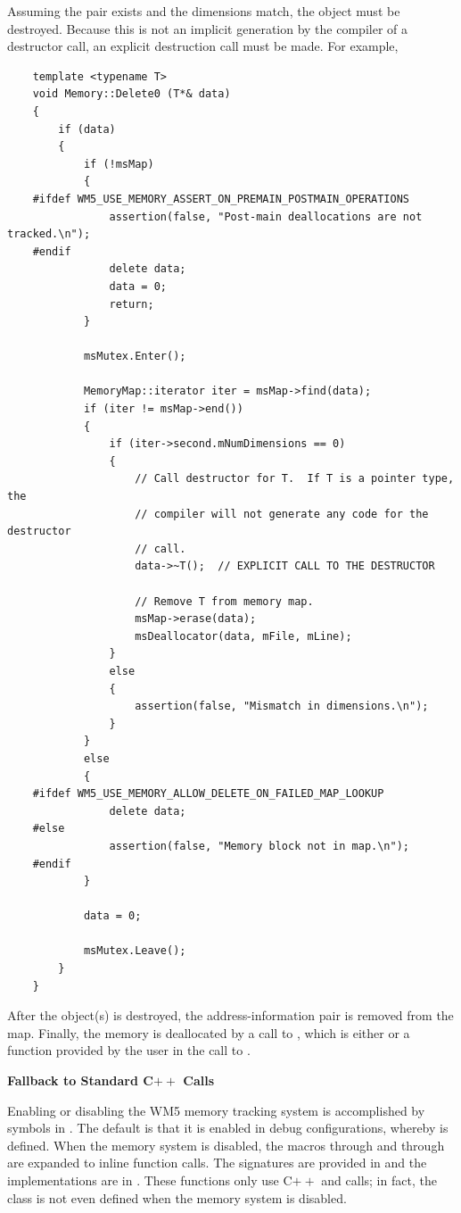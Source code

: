 \documentclass{article}
\begin{document}
Assuming the pair exists and the dimensions match, the object must be destroyed.
Because this is not an implicit generation by the compiler of a destructor call,
an explicit destruction call must be made.  For example,

\scriptsize
\begin{verbatim}
    template <typename T>
    void Memory::Delete0 (T*& data)
    {
        if (data)
        {
            if (!msMap)
            {
    #ifdef WM5_USE_MEMORY_ASSERT_ON_PREMAIN_POSTMAIN_OPERATIONS
                assertion(false, "Post-main deallocations are not tracked.\n");
    #endif
                delete data;
                data = 0;
                return;
            }

            msMutex.Enter();

            MemoryMap::iterator iter = msMap->find(data);
            if (iter != msMap->end())
            {
                if (iter->second.mNumDimensions == 0)
                {
                    // Call destructor for T.  If T is a pointer type, the
                    // compiler will not generate any code for the destructor
                    // call.
                    data->~T();  // EXPLICIT CALL TO THE DESTRUCTOR

                    // Remove T from memory map.
                    msMap->erase(data);
                    msDeallocator(data, mFile, mLine);
                }
                else
                {
                    assertion(false, "Mismatch in dimensions.\n");
                }
            }
            else
            {
    #ifdef WM5_USE_MEMORY_ALLOW_DELETE_ON_FAILED_MAP_LOOKUP
                delete data;
    #else
                assertion(false, "Memory block not in map.\n");
    #endif
            }

            data = 0;

            msMutex.Leave();
        }
    }
\end{verbatim}
\normalsize

After the object(s) is destroyed, the address-information pair is removed from the map.
Finally, the memory is deallocated by a call to , which is either
 or a function provided by the user in the call to
.

\vspace*{0.1in}
{\bf Fallback to Standard C$++$ Calls}

Enabling or disabling the WM5 memory tracking system is accomplished by
symbols in .  The default is that it is enabled in debug
configurations, whereby  is defined.  When the memory system
is disabled, the macros  through  and  through
 are expanded to inline function calls.  The signatures are provided
in  and the implementations are in .  These
functions only use C$++$  and  calls; in fact, the class
 is not even defined when the memory system is disabled.
\end{document}
